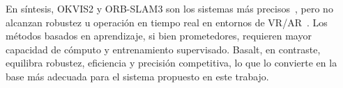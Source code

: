 En síntesis, OKVIS2 y ORB-SLAM3 son los sistemas más precisos~\cite{krishnan2025lamaria,leutenegger2022okvis2}, pero no alcanzan robustez u operación en tiempo real en entornos de VR/AR~\cite{demayo2025monadoslamdataset}. Los métodos basados en aprendizaje, si bien prometedores, requieren mayor capacidad de cómputo y entrenamiento supervisado. Basalt, en contraste, equilibra robustez, eficiencia y precisión competitiva, lo que lo convierte en la base más adecuada para el sistema propuesto en este trabajo.
